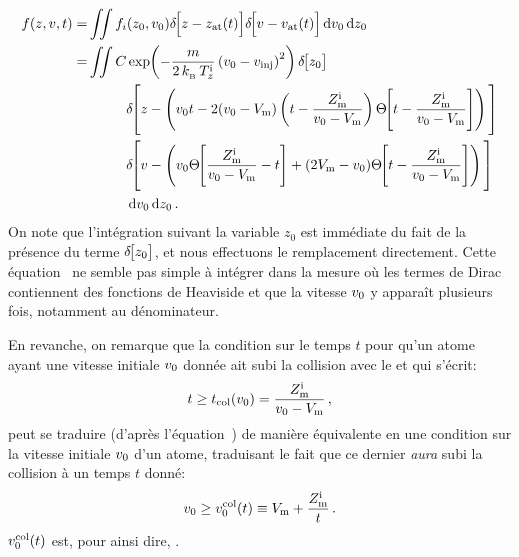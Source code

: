 {

\begin{align}
	f(z,v,t) 
	=& 
	\iint
	{
	f_i(z_0,\vini)
	}	
	{
	\Dirac{z - \zat(t)}
	}	
	{
	\Dirac{v - \vat(t)}
	}
	\ddint \vini \ddint z_0 \nonumber\\
	=& 
	\iint
	{
	C \Expo{-\frac{m}{2\,\kb\,\Tlongini} 
	\left( \vini - \vinj \right)^2}\Dirac{z_0}
	}
	\nonumber\\
	&	\;\;\;\;\;\;\;\;\;\; 
	{\DIRAC{z - \left( \vini t - 2(\vini-\Vmir)\left(t - \frac{\Zmirini}{\vini - \Vmir}\right) \Heaviside{t -  \frac{\Zmirini}{\vini - \Vmir}} \right)} 
	}
	\nonumber\\
	&	\;\;\;\;\;\;\;\;\;\; 
	{\DIRAC{v - \left( \vini \Heaviside{\frac{\Zmirini}{\vini - \Vmir} - t} + (2 \Vmir - \vini) \Heaviside{t - \frac{\Zmirini}{\vini - \Vmir}} \right)}
	}
	\nonumber\\
	&	\;\;\;\;\;\;\;\;\;\; \ddint \vini \ddint z_0
	\pointformule
	\label{eq:ftPaquet}
\end{align}
On note que l'intégration suivant la variable $z_0$ est immédiate du fait de la présence du terme $\Dirac{z_0}$, et nous effectuons le remplacement directement.
Cette équation~ ne semble pas simple à intégrer dans la mesure où les termes de Dirac contiennent des fonctions de Heaviside et que la vitesse $v_{0}$ y apparaît plusieurs fois, notamment au dénominateur. 

En revanche, on remarque que la condition sur le temps $t$ pour qu'un atome ayant une vitesse initiale $v_{0}$ donnée ait subi la collision avec le \mimo et qui s'écrit:
\[
	t \geq t_{\mathrm {col}}(v_{0}) = \frac{Z_{\mathrm {m}}^{\mathrm i}}{v_{0} - V_{\rm {m}}} 
	\, ,
\]
peut se traduire (d'après l'équation~) de manière équivalente en une condition sur la vitesse initiale $v_{0}$ d'un atome, traduisant le fait que ce dernier \emph{aura} subi la collision à un temps $t$ donné:
\begin{equation}
	\vini \geq \vinicol(t) \equiv \Vmir + \frac{\Zmirini}{t} 
	\pointformule
	\label{eq:vinicolt}
\end{equation}
$v_{0}^{\rm col}(t)$ est, pour ainsi dire, .


}
